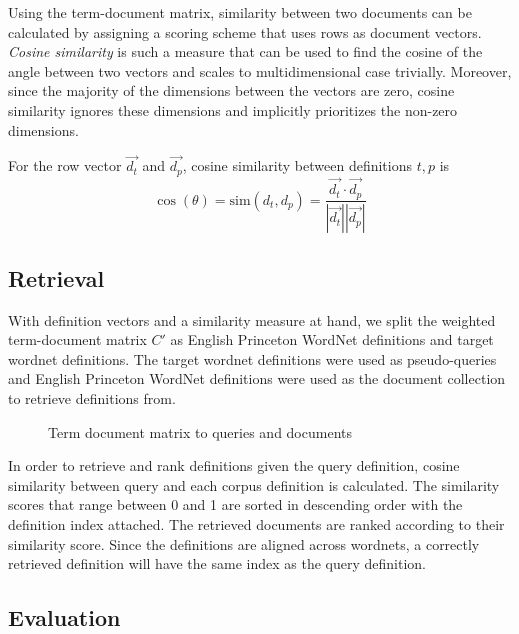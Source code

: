 Using the term-document matrix, similarity between two documents can be calculated by assigning a scoring scheme that uses rows as document vectors.
\emph{Cosine similarity} is such a measure that can be used to find the cosine of the angle between two vectors and scales to multidimensional case trivially.
Moreover, since the majority of the dimensions between the vectors are zero, cosine similarity ignores these dimensions and implicitly prioritizes the non-zero dimensions.

For the row vector $\vec{d_t}$ and $\vec{d_p}$, cosine similarity between definitions $t, p$ is
\begin{equation}
    \cos(\theta) = \text{sim}(d_t, d_p) = \frac{\vec{d_t} \cdot \vec{d_p}}{|\vec{d_t}||\vec{d_p}|}
\end{equation}

\subsection{Retrieval}%
\label{sub:retrieval}

With definition vectors and a similarity measure at hand, we split the \tfidf{} weighted term-document matrix $C'$ as English Princeton WordNet definitions and target wordnet definitions.
The target wordnet definitions were used as pseudo-queries and English Princeton WordNet definitions were used as the document collection to retrieve definitions from.

\begin{figure}[htbp]
    \centering
    \caption{Term document matrix to queries and documents}%
    \label{fig:term_document}
\end{figure}

In order to retrieve and rank definitions given the query definition, cosine similarity between query and each corpus definition is calculated.
The similarity scores that range between 0 and 1 are sorted in descending order with the definition index attached.
The retrieved documents are ranked according to their similarity score.
Since the definitions are aligned across wordnets, a correctly retrieved definition will have the same index as the query definition.

\subsection{Evaluation}%
\label{sub:evaluation}

